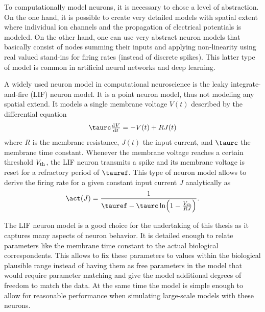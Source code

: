 To computationally model neurons, it is necessary to chose a level of abstraction.
On the one hand, it is possible to create very detailed models with spatial extent \parencite[e.g.,][]{markram2015,bahl2012} where individual ion channels and the propagation of electrical potentials is modeled.
On the other hand, one can use very abstract neuron models that basically consist of nodes summing their inputs and applying non-linearity using real valued stand-ins for firing rates (instead of discrete spikes).
This latter type of model is common in artificial neural networks and deep learning.

A widely used neuron model in computational neuroscience is the leaky integrate-and-fire (LIF) neuron model.
It is a point neuron model, thus not modeling any spatial extend.
It models a single membrane voltage $V(t)$ described by the differential equation
\begin{equation}
    \taurc \od{V}{t} = -V(t) + R J(t)
\end{equation}
where $R$ is the membrane resistance, $J(t)$ the input current, and $\taurc$ the membrane time constant.
Whenever the membrane voltage reaches a certain threshold $V_{{\mathrm{th}}}$, the LIF neuron transmits a spike and its membrane voltage is reset for a refractory period of $\tauref$.
This type of neuron model allows to derive the firing rate for a given constant input current $J$ analytically as
\begin{equation}
    \act(J) = \frac{1}{\tauref - \taurc \ln\!\del{1 - \frac{V_{\ped{th}}}{R J}}} \text{.}
\end{equation}

The LIF neuron model is a good choice for the undertaking of this thesis as it captures many aspects of neuron behavior.
It is detailed enough to relate parameters like the membrane time constant to the actual biological correspondents.
This allows to fix these parameters to values within the biological plausible range instead of having them as free parameters in the model that would require parameter matching and give the model additional degrees of freedom to match the data.
At the same time the model is simple enough to allow for reasonable performance when simulating large-scale models with these neurons.
